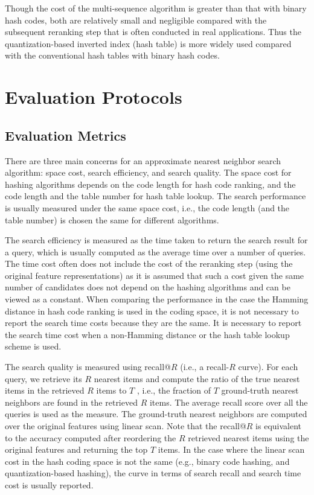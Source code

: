 \documentclass[10pt,journal,compsoc]{IEEEtran}
\begin{document}
Though the cost of the multi-sequence algorithm is greater
than that with binary hash codes,
both are relatively small and negligible
compared with the subsequent reranking step
that is often conducted in real applications.
Thus the quantization-based inverted index (hash table)
is more widely used
compared with
the conventional hash tables with binary hash codes.






\section{Evaluation Protocols}
\label{sec:evaluationprotocols}
\subsection{Evaluation Metrics}
There are three main concerns
for an approximate nearest neighbor search algorithm:
space cost,
search efficiency,
and search quality.
The space cost for hashing algorithms
depends on the code length for hash code ranking,
and the code length and the table number for hash table lookup.
The search performance is usually measured
under the same space cost,
i.e.,
the code length (and the table number)
is chosen the same for different algorithms.

The search efficiency
is measured
as the time taken to
return the search result for a query,
which is usually computed as the average time
over a number of queries.
The time cost often does not include the cost
of the reranking step
(using the original feature representations)
as it is assumed that
such a cost given the same number of candidates
does not depend on the hashing algorithms
and can be viewed as a constant.
When comparing the performance
in the case the Hamming distance in hash code ranking
is used in the coding space,
it is not necessary
to report the search time costs
because they are the same.
It is necessary to report the search time cost
when a non-Hamming distance or the hash table lookup scheme
is used.


The search quality is measured using recall@$R$ (i.e., a recall-$R$ curve).
For each
query, we retrieve its $R$ nearest items
and compute the ratio of the true nearest items in
the retrieved $R$ items to $T$ ,
i.e., the fraction of $T$ ground-truth nearest
neighbors are found in the retrieved $R$ items.
The average
recall score over all the queries is used as the measure.
The ground-truth nearest neighbors are computed over the
original features using linear scan.
Note that the recall@$R$ is equivalent to the accuracy computed
after reordering the $R$ retrieved nearest items
using the original features
and returning the top $T$ items.
In the case where the linear scan cost in the hash coding space
is not the same
(e.g., binary code hashing, and quantization-based hashing),
the curve in terms of
search recall and search time cost is usually reported.
\end{document}
